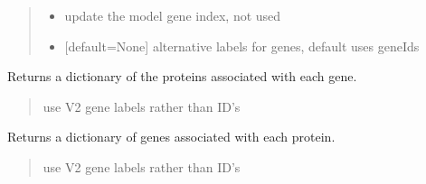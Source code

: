 \documentclass[letterpaper,12pt,english]{sphinxmanual}
\begin{document}
\begin{fulllineitems}
\begin{fulllineitems}
\begin{quote}
\begin{description}
\begin{itemize}
\item {} 
\sphinxAtStartPar
{} \textendash{} update the model gene index, not used

\item {} 
\sphinxAtStartPar
{} \textendash{} {[}default=None{]} alternative labels for genes, default uses geneIds

\end{itemize}

\end{description}\end{quote}

\end{fulllineitems}


\begin{fulllineitems}
\label{\detokenize{api/core:cbmpy.CBModel.Model.getAllProteinGeneAssociations}}
\pysigstartsignatures
\pysiglinewithargsret
{}
{}
{}
\pysigstopsignatures
\sphinxAtStartPar
Returns a dictionary of the proteins associated with each gene.
\begin{quote}\begin{description}
\sphinxAtStartPar
{} \textendash{} use V2 gene labels rather than ID’s

\end{description}\end{quote}

\end{fulllineitems}


\begin{fulllineitems}
\label{\detokenize{api/core:cbmpy.CBModel.Model.getAllGeneProteinAssociations}}
\pysigstartsignatures
\pysiglinewithargsret
{}
{}
{}
\pysigstopsignatures
\sphinxAtStartPar
Returns a dictionary of genes associated with each protein.
\begin{quote}\begin{description}
\sphinxAtStartPar
{} \textendash{} use V2 gene labels rather than ID’s


\end{description}
\end{quote}
\end{fulllineitems}
\end{fulllineitems}
\end{document}
